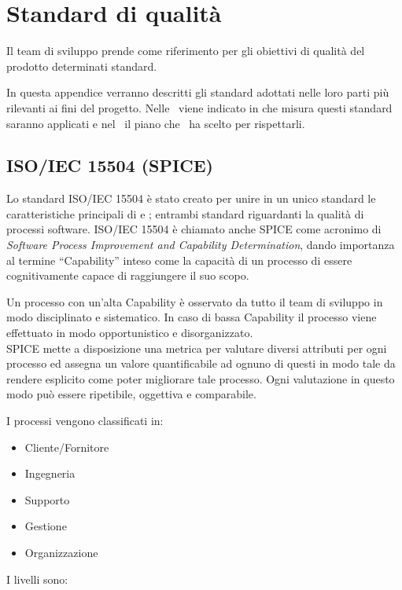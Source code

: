 \newpage
\section{Standard di qualità}	\label{StandardQualita}
Il team di sviluppo prende come riferimento per gli obiettivi di qualità del prodotto determinati standard.

In questa appendice verranno descritti gli standard adottati nelle loro parti più rilevanti ai fini del progetto. Nelle \NdPd\ viene indicato in che misura questi standard saranno applicati e nel \PdQd\ il piano che \gruppo\ ha scelto per rispettarli.

	\subsection{ISO/IEC 15504 (SPICE)}
	Lo standard ISO/IEC 15504 è stato creato per unire in un unico standard le caratteristiche principali di  e ; entrambi standard riguardanti la qualità di processi software.
	ISO/IEC 15504 è chiamato anche SPICE come acronimo di \textit{Software Process Improvement and Capability Determination}, dando importanza al termine ``Capability'' inteso come la capacità di un processo di essere cognitivamente capace di raggiungere il suo scopo. 
	
	Un processo con un'alta Capability è osservato da tutto il team di sviluppo in modo disciplinato e sistematico.
	In caso di bassa Capability il processo viene effettuato in modo opportunistico e disorganizzato.\\
	
	SPICE mette a disposizione una metrica per valutare diversi attributi per ogni processo ed assegna un valore quantificabile ad ognuno di questi in modo tale da rendere esplicito come poter migliorare tale processo. Ogni valutazione in questo modo può essere ripetibile, oggettiva e comparabile.
	
	I processi vengono classificati in:

	

	\begin{itemize}
		\item Cliente/Fornitore
		\item Ingegneria
		\item Supporto
		\item Gestione
		\item Organizzazione
	\end{itemize}
	
	I livelli sono:
	
